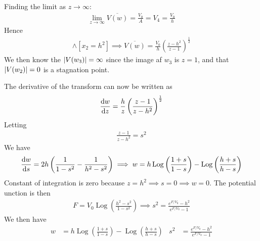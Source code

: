 \documentclass[12pt, english]{book}
\DeclareMathOperator\Log{Log}
\begin{document}
	Finding the limit as \(z \rightarrow \infty\):
	\begin{align*}
		\lim_{z \rightarrow \infty} \overline{V(w)}
		= \frac{V_0}{A} = V_4 =  \frac{V_0}{h}
	\end{align*}
	Hence 
	\begin{align*}
		[A = h] \land [x_2 = h^2] 
		\implies \overline{V(w)} = \frac{V_0}{h} \left(\frac{z-h^2}{z-1}\right)^\frac{1}{2}
	\end{align*}
	We then know the \(\abs{V(w_3)} = \infty\) since the image af \(w_3\) is \(z = 1\), and that \(\abs{V(w_2)} = 0\) is a stagnation point.
	
	The derivative of the transform can now be written as
	\begin{align*}
		\dv{w}{z} = \frac{h}{z} \left(\frac{z - 1}{z - h^2}\right)^\frac{1}{2}
	\end{align*}
	Letting 
	\begin{align*}
		\frac{z - 1}{z - h^2} = s^2
	\end{align*}
	We have
	\begin{align*}
		\dv{w}{s} = 2h \left(\frac{1}{1-s^2} - \frac{1}{h^2 - s^2}\right)
		\implies w = h \Log\left(\frac{1+s}{1-s}\right) - \Log\left(\frac{h+s}{h-s}\right)
	\end{align*}
	Constant of integration is zero because \(z = h^2 \implies s = 0 \implies w = 0\).
	The potential unction is then 
	\begin{align*}
		F = V_0 \Log\left(\frac{h^2 - s^2}{1-s^2}\right)
		\implies s^2 = \frac{e^{F/V_0} - h^2}{e^{F/V_0} - 1}
	\end{align*}
	We then have 
	\begin{align*}
		w &= h \Log\left(\frac{1+s}{1-s}\right) - \Log\left(\frac{h+s}{h-s}\right) &
		s^2 &= \frac{e^{F/V_0} - h^2}{e^{F/V_0} - 1}
	\end{align*}
\end{document}

